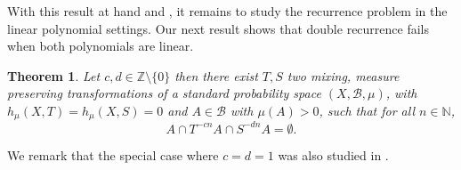 \documentclass[12pt,reqno]{amsart}
\newcommand{\N}{\mathbb{N}}
\newcommand{\Z}{\mathbb{Z}}
\newcommand{\B}{\mathcal{B}}
\newtheorem{thm}{Theorem}[section]
\theoremstyle{definition}
\begin{document}
With this result at hand and \cite[Theorem 1.3.]{Frantzikinakis_Host_2023}, it remains to study the recurrence problem in the linear polynomial settings. Our next result shows that double recurrence fails when both polynomials are linear. 

\begin{thm}\label{thm:recurrence_2} Let $c,d \in \Z \setminus \{0\}$ then there exist $T,S$ two mixing, measure preserving transformations of a standard probability space $(X,\B,\mu)$, with $h_{\mu}(X,T) = h_{\mu}(X,S) = 0$ and $A\in\B$ with $\mu(A)>0$, such that for all $n\in\N$,
\[
A\cap T^{-cn}A\cap S^{-dn}A = \emptyset.
\]
\end{thm}

 We remark that the special case where $c=d=1$ was also studied in \cite{ryzhikov_2024_B}. 
 


 
\end{document}
